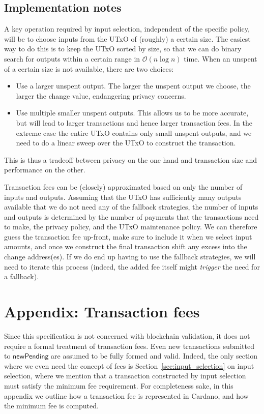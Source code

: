 \documentclass{article}
\newcommand{\order}[1]{\mathcal{O}\left(#1\right)}
\numberwithin{equation}{lemma}
\begin{document}
\subsection{Implementation notes}

A key operation required by input selection, independent of the specific policy,
will be to choose inputs from the UTxO of (roughly) a certain size. The easiest
way to do this is to keep the UTxO sorted by size, so that we can do binary
search for outputs within a certain range in $\order{n \log n}$ time. When an
unspent of a certain size is not available, there are two choices:
%
\begin{itemize}
\item Use a larger unspent output. The larger the unspent output we choose,
the larger the change value, endangering privacy concerns.
\item Use multiple smaller unspent outputs. This allows us to be more
accurate, but will lead to larger transactions and hence larger transaction
fees. In the extreme case the entire UTxO contains only small unspent outputs,
and we need to do a linear sweep over the UTxO to construct the transaction.
\end{itemize}
%
This is thus a tradeoff between privacy on the one hand and transaction size
and performance on the other.

Transaction fees can be (closely) approximated based on only the number of
inputs and outputs. Assuming that the UTxO has sufficiently many outputs
available that we do not need any of the fallback strategies, the number of
inputs and outputs is determined by the number of payments that the transactions
need to make, the privacy policy, and the UTxO maintenance policy. We can
therefore guess the transaction fee up-front, make sure to include it when we
select input amounts, and once we construct the final transaction shift any
excess into the change address(es).  If we do end up having to use the fallback
strategies, we will need to iterate this process (indeed, the added fee itself
might \emph{trigger} the need for a fallback).

\appendix

\section{Appendix: Transaction fees}
\label{app:transaction_fees}

Since this specification is not concerned with blockchain validation, it does
not require a formal treatment of transaction fees. Even new transactions
submitted to $\mathsf{newPending}$ are assumed to be fully formed and valid.
Indeed, the only section where we even need the concept of fees is
Section~\ref{sec:input_selection} on input selection, where we mention that a
transaction constructed by input selection must satisfy the minimum fee
requirement. For completeness sake, in this appendix we outline how a
transaction fee is represented in Cardano, and how the minimum fee is computed.
\end{document}
